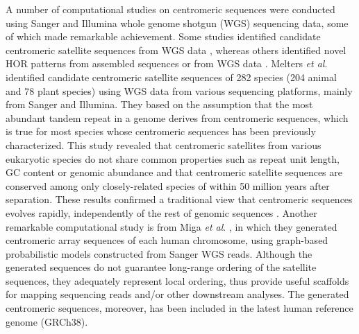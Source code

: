 A number of computational studies on centromeric sequences were conducted using Sanger and Illumina whole genome shotgun (WGS) sequencing data, some of which made remarkable achievement. Some studies identified candidate centromeric satellite sequences from WGS data \cite{Alkan2011, Melters2013}, whereas others identified novel HOR patterns from assembled sequences \cite{Rosandic2003} or from WGS data \cite{Alkan2007}.
Melters \textit{et al}. \cite{Melters2013} identified candidate centromeric satellite sequences of 282 species (204 animal and 78 plant species) using WGS data from various sequencing platforms, mainly from Sanger and Illumina. They based on the assumption that the most abundant tandem repeat in a genome derives from centromeric sequences, which is true for most species whose centromeric sequences has been previously characterized. This study revealed that centromeric satellites from various eukaryotic species do not share common properties such as repeat unit length, GC content or genomic abundance and that centromeric satellite sequences are conserved among only closely-related species of within 50 million years after separation. These results confirmed a traditional view that centromeric sequences evolves rapidly, independently of the rest of genomic sequences \cite{Henikoff2001}.
Another remarkable computational study is from Miga \textit{et al}. \cite{Miga2014}, in which they generated centromeric array sequences of each human chromosome, using graph-based probabilistic models constructed from Sanger WGS reads. Although the generated sequences do not guarantee long-range ordering of the satellite sequences, they adequately represent local ordering, thus provide useful scaffolds for mapping sequencing reads and/or other downstream analyses. The generated centromeric sequences, moreover, has been included in the latest human reference genome (GRCh38).

